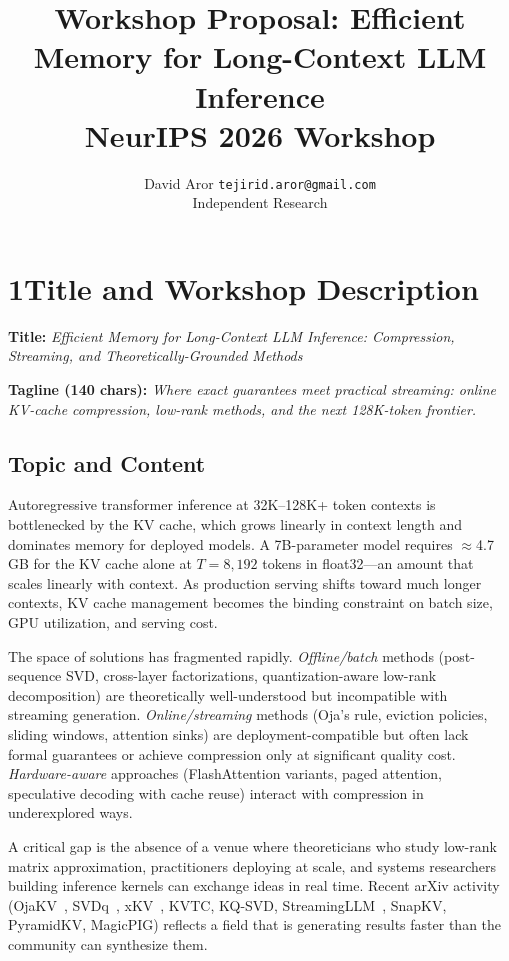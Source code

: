 \documentclass{article}
\title{\textbf{Workshop Proposal: Efficient Memory for Long-Context LLM Inference}\\
\large NeurIPS 2026 Workshop}
\author{
  David Aror \quad \texttt{tejirid.aror@gmail.com}\\
  Independent Research
}
\date{}
\begin{document}
\maketitle


\section*{1\quad Title and Workshop Description}

\textbf{Title:} \emph{Efficient Memory for Long-Context LLM Inference: Compression, Streaming, and Theoretically-Grounded Methods}

\textbf{Tagline (140 chars):}
\textit{Where exact guarantees meet practical streaming: online KV-cache compression, low-rank methods, and the next 128K-token frontier.}

\subsection*{Topic and Content}

Autoregressive transformer inference at 32K--128K+ token contexts is bottlenecked
by the KV cache, which grows linearly in context length and dominates memory for
deployed models.  A 7B-parameter model requires $\approx$4.7\,GB for the KV cache
alone at $T{=}8{,}192$ tokens in float32---an amount that scales linearly with
context.  As production serving shifts toward much longer contexts, KV cache
management becomes the binding constraint on batch size, GPU utilization, and
serving cost.

The space of solutions has fragmented rapidly.  \emph{Offline/batch} methods
(post-sequence SVD, cross-layer factorizations, quantization-aware low-rank
decomposition) are theoretically well-understood but incompatible with streaming
generation.  \emph{Online/streaming} methods (Oja's rule, eviction policies,
sliding windows, attention sinks) are deployment-compatible but often lack
formal guarantees or achieve compression only at significant quality cost.
\emph{Hardware-aware} approaches (FlashAttention variants, paged attention,
speculative decoding with cache reuse) interact with compression in
underexplored ways.

A critical gap is the absence of a venue where theoreticians who study
low-rank matrix approximation, practitioners deploying at scale, and
systems researchers building inference kernels can exchange ideas in real time.
Recent arXiv activity (OjaKV~\cite{ojakov2025}, SVDq~\cite{svdq2025},
xKV~\cite{xkv2025}, KVTC, KQ-SVD, StreamingLLM~\cite{streamingllm2023},
SnapKV, PyramidKV, MagicPIG) reflects a field that is generating results
faster than the community can synthesize them.
\end{document}
